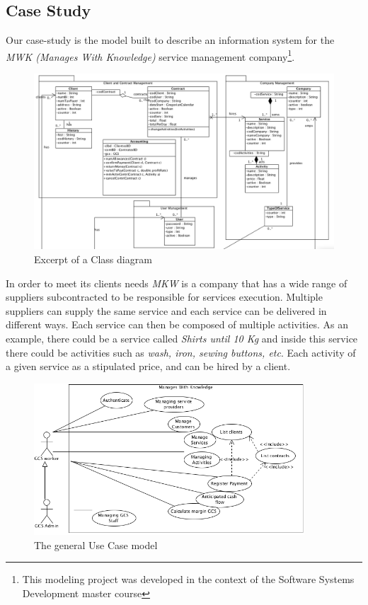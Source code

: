 \subsection*{Case Study}
Our case-study is the model built to describe an information system for the \textit{MWK (Manages With Knowledge)} service management company\footnote{This modeling project was developed in the context of the Software Systems Development master course}.

\begin{figure}[!htbp]
\begin{center}
\includegraphics[scale=0.345]{images/classbw.png}
\caption{Excerpt of a Class diagram}\label{fig:class}
\end{center}
\end{figure} 

In order to meet its clients needs \emph{MKW} is a company that has a wide range of suppliers subcontracted to be responsible for services execution.
Multiple suppliers can supply the same service and each service can be delivered in different ways.
Each service can then be composed of multiple activities. As an example, there could be a service called \textit{Shirts until 10 Kg} and inside this service there could be activities such as \textit{wash, iron, sewing buttons, etc}.
Each activity of a given service as a stipulated price, and can be hired by a client.

\begin{figure}[!htbp]
\begin{center}
\includegraphics[width=0.9\textwidth]{images/usecase.png}
\caption{The general Use Case model}\label{fig:usecase}
\end{center}
\end{figure} 


